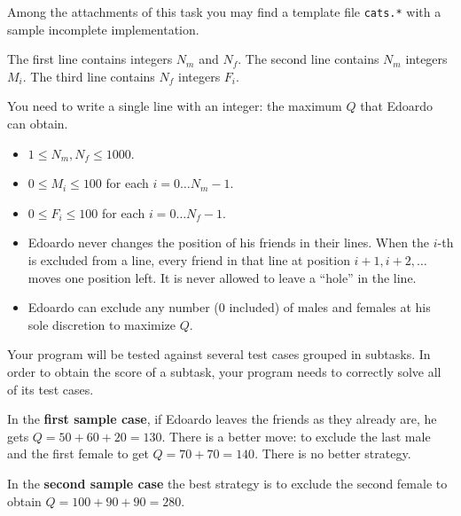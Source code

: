 \begin{warning}
Among the attachments of this task you may find a template file \texttt{cats.*} with a sample incomplete implementation.
\end{warning}

\InputFile
The first line contains integers $N_m$ and $N_f$. The second line contains $N_m$ integers $M_i$. The third line contains $N_f$ integers $F_i$.

\OutputFile
You need to write a single line with an integer: the maximum $Q$ that Edoardo can obtain. 

\Constraints
\begin{itemize}[nolistsep, itemsep=2mm]
	\item $1 \le N_m, N_f \le 1000$.
	\item $0 \le M_i \le 100$ for each $i=0\ldots N_m-1$.
	\item $0 \le F_i \le 100$ for each $i=0\ldots N_f-1$.
	\item Edoardo never changes the position of his friends in their lines. When the $i$-th is excluded from a line, every friend in that line at position $i+1, i+2, \ldots$ moves one position left. It is never allowed to leave a ``hole'' in the line.
        \item Edoardo can exclude any number (0 included) of males and females at his sole discretion to maximize $Q$.
\end{itemize}

\Scoring
Your program will be tested against several test cases grouped in subtasks.
In order to obtain the score of a subtask, your program needs to correctly solve all of its test cases.








\Examples
\begin{example}
%
%
\end{example}


\Explanation
In the \textbf{first sample case}, if Edoardo leaves the friends as they already are, he gets $Q = 50 + 60 + 20 = 130$. There is a better move: to exclude the last male and the first female to get $Q = 70 + 70 = 140$. There is no better strategy.

In the \textbf{second sample case} the best strategy is to exclude the second female to obtain $Q = 100 + 90 + 90 = 280$.

